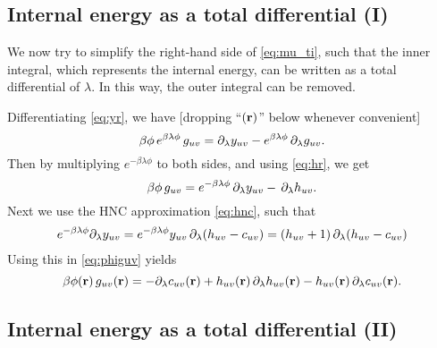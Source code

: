 \documentclass[12pt]{article}
\begin{document}
\subsection{Internal energy as a total differential (I)}


We now try to simplify the right-hand side of \eqref{eq:mu_ti}, such that
the inner integral, which represents the internal energy, can be written
as a total differential of $\lambda$.
%
In this way, the outer integral can be removed.

Differentiating \eqref{eq:yr}, we have [dropping ``$(\mathbf{r})$'' below whenever convenient]
\[
  \beta \phi \, e^{ \beta \lambda \phi } \, g_{uv}
  =
  \partial_\lambda y_{uv}
    -
    e^{ \beta \lambda \phi } \, \partial_\lambda g_{uv}.
\]
Then by multiplying $e^{-\beta \lambda \phi}$ to both sides,
and using \eqref{eq:hr}, we get
\begin{equation}
  \beta \phi \, g_{uv}
  =
  e^{ -\beta \lambda \phi } \, \partial_\lambda y_{uv}
  - \, \partial_\lambda h_{uv}.
  \label{eq:phiguv}
\end{equation}
%
Next we use the HNC approximation \eqref{eq:hnc}, such that
%
\begin{align*}
  e^{ -\beta \lambda \phi} \partial_\lambda y_{uv}
  = e^{ -\beta \lambda \phi} y_{uv} \, \partial_\lambda (h_{uv} - c_{uv})
  = (h_{uv} + 1) \, \partial_\lambda (h_{uv} - c_{uv})
\end{align*}
%
Using this in \eqref{eq:phiguv} yields
\begin{equation}
  \beta \phi(\mathbf{r}) \, g_{uv}(\mathbf{r})
  =
  - \partial_\lambda c_{uv}(\mathbf{r}) + h_{uv}(\mathbf{r}) \, \partial_\lambda h_{uv}(\mathbf{r}) - h_{uv}(\mathbf{r}) \, \partial_\lambda c_{uv}(\mathbf{r}).
  \label{eq:hc1}
\end{equation}



\subsection{Internal energy as a total differential (II)}
\end{document}
